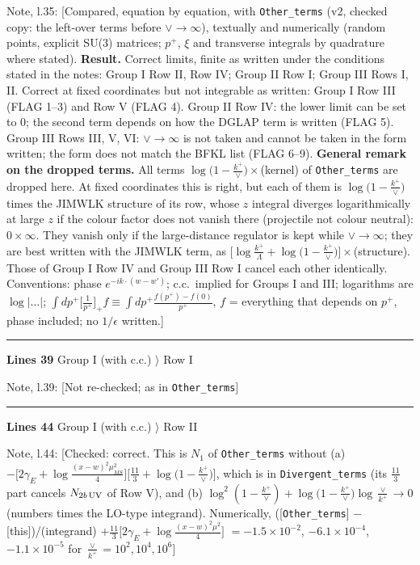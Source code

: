 \documentclass[10pt]{article}
\newenvironment{notebox}{\def\FrameCommand{{\color{notebar}\vrule width 1.5pt}\hspace{6pt}}\MakeFramed{\advance\hsize-\width\FrameRestore}\small}{\endMakeFramed}
\begin{document}
\begin{notebox}\textsf{\small Note, l.35:} [Compared, equation by equation, with \texttt{Other\_terms} (v2, checked copy: the left-over terms before $\vee\to\infty$), textually and numerically (random points, explicit SU(3) matrices; $p^{+}$, $\xi$ and transverse integrals by quadrature where stated). \textbf{Result.} Correct limits, finite as written under the conditions stated in the notes: Group I Row II, Row IV; Group II Row I; Group III Rows I, II. Correct at fixed coordinates but not integrable as written: Group I Row III (FLAG 1--3) and Row V (FLAG 4). Group II Row IV: the lower limit can be set to $0$; the second term depends on how the DGLAP term is written (FLAG 5). Group III Rows III, V, VI: $\vee\to\infty$ is not taken and cannot be taken in the form written; the form does not match the BFKL list (FLAG 6--9). \textbf{General remark on the dropped terms.} All terms $\log\big(1-\frac{k^{+}}{\vee}\big)\times$(kernel) of \texttt{Other\_terms} are dropped here. At fixed coordinates this is right, but each of them is $\log\big(1-\frac{k^{+}}{\vee}\big)$ times the JIMWLK structure of its row, whose $z$ integral diverges logarithmically at large $z$ if the colour factor does not vanish there (projectile not colour neutral): $0\times\infty$. They vanish only if the large-distance regulator is kept while $\vee\to\infty$; they are best written with the JIMWLK term, as $\big[\log\frac{k^{+}}{\Lambda}+\log\big(1-\frac{k^{+}}{\vee}\big)\big]\times$(structure). Those of Group I Row IV and Group III Row I cancel each other identically. Conventions: phase $e^{-ik\cdot(w-w')}$; c.c.\ implied for Groups I and III; logarithms are $\log|\dots|$; $\int dp^{+}\big[\frac{1}{p^{+}}\big]_{+}f\equiv\int dp^{+}\frac{f(p^{+})-f(0)}{p^{+}}$, $f$ = everything that depends on $p^{+}$, phase included; no $1/\epsilon$ written.]\end{notebox}
\noindent\rule{\linewidth}{0.3pt}\par\noindent\textbf{Lines 39} \quad \textsf{Group I (with c.c.) $\rangle$ Row I}\par
\begin{notebox}\textsf{\small Note, l.39:} [Not re-checked; as in \texttt{Other\_terms}]\end{notebox}
\noindent\rule{\linewidth}{0.3pt}\par\noindent\textbf{Lines 44} \quad \textsf{Group I (with c.c.) $\rangle$ Row II}\par
\begin{notebox}\textsf{\small Note, l.44:} [Checked: correct. This is $N_{1}$ of \texttt{Other\_terms} without (a) $-\big[2\gamma_{E}+\log\frac{(x-w)^{2}\mu^{2}_{\overline{MS}}}{4}\big]\big[\frac{11}{3}+\log\big(1-\frac{k^{+}}{\vee}\big)\big]$, which is in \texttt{Divergent\_terms} (its $\frac{11}{3}$ part cancels $N_{2b\,\rm UV}$ of Row V), and (b) $\log^{2}(1-\frac{k^{+}}{\vee})+\log\big(1-\frac{k^{+}}{\vee}\big)\log\frac{\vee}{k^{+}}\to0$ (numbers times the LO-type integrand). Numerically, ([\texttt{Other\_terms}] $-$ [this])/(integrand) $+\frac{11}{3}\big[2\gamma_{E}+\log\frac{(x-w)^{2}\mu^{2}}{4}\big]$ $=-1.5\times10^{-2}$, $-6.1\times10^{-4}$, $-1.1\times10^{-5}$ for $\frac{\vee}{k^{+}}=10^{2},10^{4},10^{6}$]\end{notebox}
\end{document}
